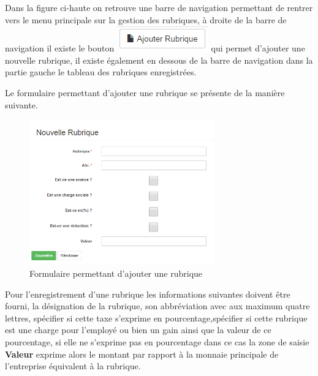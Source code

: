 \documentclass[12pt,a4paper]{report}
\begin{document}
Dans la figure ci-haute on retrouve une barre de navigation permettant de rentrer vers le menu principale sur la gestion des rubriques, à droite de la barre de navigation il existe le bouton \includegraphics[scale=1]{pic/AddRubriques.png} qui permet d'ajouter une nouvelle rubrique, il existe également en dessous de la barre de navigation dans la partie gauche le tableau des rubriques enregistrées.

Le formulaire permettant d'ajouter une rubrique se présente de la manière suivante. 

\begin{figure}[h]
\begin{center}
\includegraphics[width=8cm]{pic/NewRubric.png}
\end{center}
\caption{Formulaire permettant d'ajouter une rubrique}
\label{Formulaire permettant d'ajouter une rubrique}
\end{figure} 

Pour l'enregistrement d'une rubrique les informations suivantes doivent être fourni, la désignation de la rubrique, son abbréviation avec aux maximum quatre lettres, spécifier si cette taxe s'exprime en pourcentage,spécifier si cette rubrique est une charge pour l'employé ou bien un gain ainsi que la valeur de ce pourcentage, si elle ne s'exprime pas en pourcentage dans ce cas la zone de saisie \textbf{Valeur} exprime alors le montant par rapport à la monnaie principale de l'entreprise équivalent à la rubrique. 
\end{document}
